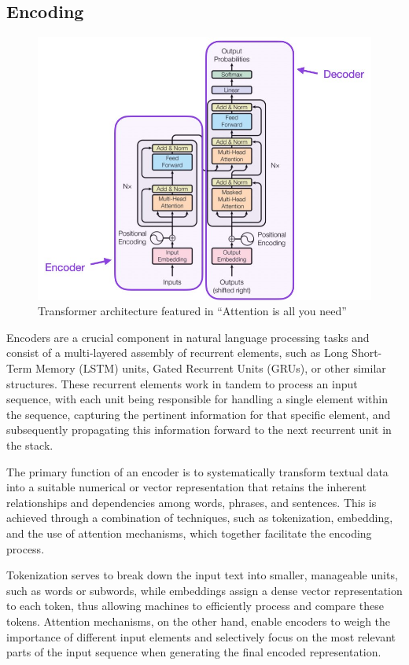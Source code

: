 \subsection{Encoding}
\label{sec:encoders}


\begin{figure}[h!]
    \centering
    \includegraphics[width=0.8\linewidth]{pics/transformer.jpg}
    \caption{Transformer architecture featured in “Attention is all you need” \cite{https://doi.org/10.48550/arxiv.1706.03762}}
    \label{fig:transformer}
\end{figure}

Encoders\cite{kumar2022deep} are a crucial component in natural language processing tasks and consist of a multi-layered assembly of recurrent elements, such as Long Short-Term Memory (LSTM) units, Gated Recurrent Units (GRUs), or other similar structures. These recurrent elements work in tandem to process an input sequence, with each unit being responsible for handling a single element within the sequence, capturing the pertinent information for that specific element, and subsequently propagating this information forward to the next recurrent unit in the stack.

The primary function of an encoder is to systematically transform textual data into a suitable numerical or vector representation that retains the inherent relationships and dependencies among words, phrases, and sentences\cite{cho-etal-2014-learning}. This is achieved through a combination of techniques, such as tokenization, embedding, and the use of attention mechanisms, which together facilitate the encoding process.

Tokenization serves to break down the input text into smaller, manageable units, such as words or subwords, while embeddings assign a dense vector representation to each token, thus allowing machines to efficiently process and compare these tokens. Attention mechanisms, on the other hand, enable encoders to weigh the importance of different input elements and selectively focus on the most relevant parts of the input sequence when generating the final encoded representation.

